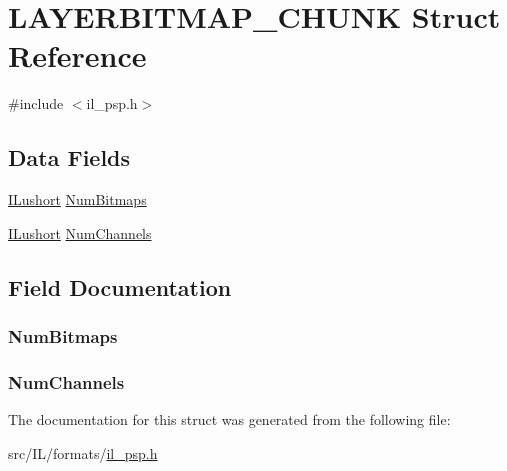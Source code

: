 \hypertarget{struct_l_a_y_e_r_b_i_t_m_a_p___c_h_u_n_k}{\section{L\-A\-Y\-E\-R\-B\-I\-T\-M\-A\-P\-\_\-\-C\-H\-U\-N\-K Struct Reference}
\label{struct_l_a_y_e_r_b_i_t_m_a_p___c_h_u_n_k}
}


{\ttfamily \#include $<$il\-\_\-psp.\-h$>$}

\subsection*{Data Fields}
\begin{DoxyCompactItemize}
\item 
\hyperlink{il_8h_af6287b43748354a7c4864da43ae56962}{I\-Lushort} \hyperlink{struct_l_a_y_e_r_b_i_t_m_a_p___c_h_u_n_k_ae0893251e5f4b526bf4351f0d235d15e}{Num\-Bitmaps}
\item 
\hyperlink{il_8h_af6287b43748354a7c4864da43ae56962}{I\-Lushort} \hyperlink{struct_l_a_y_e_r_b_i_t_m_a_p___c_h_u_n_k_ae1613ab2a201ef802fd6b2eae503ff52}{Num\-Channels}
\end{DoxyCompactItemize}


\subsection{Field Documentation}
\hypertarget{struct_l_a_y_e_r_b_i_t_m_a_p___c_h_u_n_k_ae0893251e5f4b526bf4351f0d235d15e}{
\subsubsection[{Num\-Bitmaps}]{ Num\-Bitmaps}}\label{struct_l_a_y_e_r_b_i_t_m_a_p___c_h_u_n_k_ae0893251e5f4b526bf4351f0d235d15e}
\hypertarget{struct_l_a_y_e_r_b_i_t_m_a_p___c_h_u_n_k_ae1613ab2a201ef802fd6b2eae503ff52}{
\subsubsection[{Num\-Channels}]{ Num\-Channels}}\label{struct_l_a_y_e_r_b_i_t_m_a_p___c_h_u_n_k_ae1613ab2a201ef802fd6b2eae503ff52}


The documentation for this struct was generated from the following file\-:\begin{DoxyCompactItemize}
\item 
src/\-I\-L/formats/\hyperlink{il__psp_8h}{il\-\_\-psp.\-h}\end{DoxyCompactItemize}
